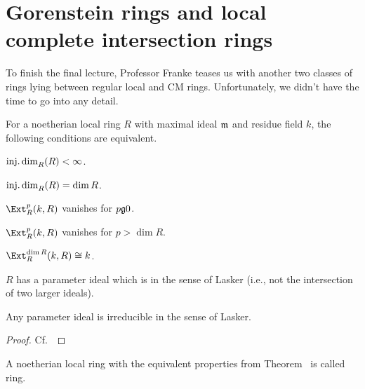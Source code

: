 \documentclass[a4paper,parskip=half,numbers=enddot, DIV=12]{scrreprt}
\begin{document}
\section{Gorenstein rings and local complete intersection rings}
To finish the final lecture, Professor Franke teases us with another two classes of rings lying between regular local and CM rings. Unfortunately, we didn't have the time to go into any detail.
\begin{thm}
	For a noetherian local ring $R$ with maximal ideal $\mathfrak{m}$ and residue field $k$, the following conditions are equivalent.
	\begin{alphanumerate}
		\item $\operatorname{inj.dim}_R(R)<\infty$.
		\item $\operatorname{inj.dim}_R(R)=\dim R$.
		\item $\Ext_R^p(k,R)$ vanishes for $p\gge 0$.
		\item $\Ext_R^p(k,R)$ vanishes for $p>\dim R$.
		\item $\Ext_R^{\dim R}(k,R)\cong k$.
		\item $R$ has a parameter ideal which is  in the sense of Lasker (i.e., not the intersection of two larger ideals).
		\item Any parameter ideal is irreducible in the sense of Lasker.
	\end{alphanumerate}
\end{thm}
\begin{proof}
	Cf.\ \cite[Theorem~18.1]{matsumuraCRT}
\end{proof}
\begin{defi}
	A noetherian local ring with the equivalent properties from Theorem~ is called  ring.
\end{defi}
\end{document}
